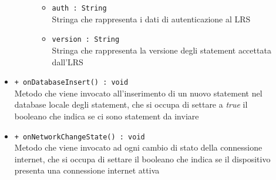 \documentclass[../Tesi.tex]{subfiles}
\begin{document}
\begin{description}
\begin{itemize}
\begin{description}
\begin{itemize}
						\item \texttt{auth : String}\\
						Stringa che rappresenta i dati di autenticazione al LRS

						\item \texttt{version : String}\\
						Stringa che rappresenta la versione degli statement accettata dall'LRS
					\end{itemize}
				\end{description}

				\item \texttt{+ onDatabaseInsert() : void}\\
				Metodo che viene invocato all'inserimento di un nuovo statement nel database locale degli statement, che si occupa di settare a \textit{true} il booleano che indica se ci sono statement da inviare

				\item \texttt{+ onNetworkChangeState() : void}\\
				Metodo che viene invocato ad ogni cambio di stato della connessione internet, che si occupa di settare il booleano che indica se il dispositivo presenta una connessione internet attiva

			\end{itemize}
		\end{description}
\end{document}
